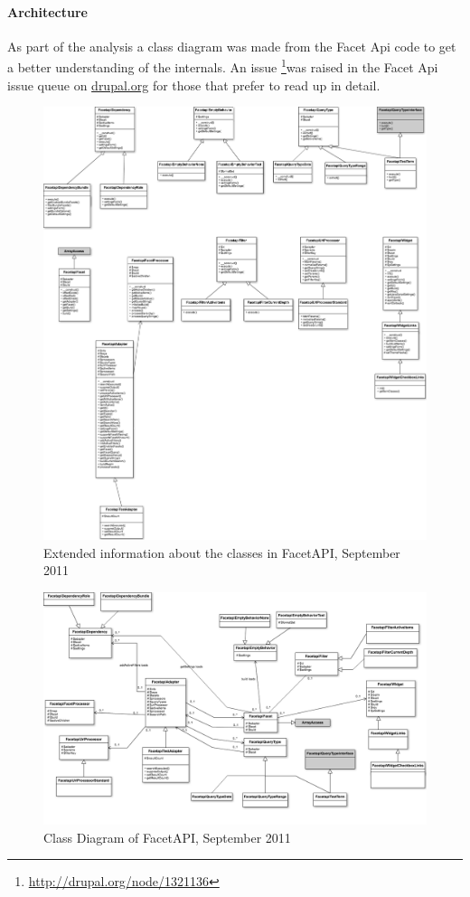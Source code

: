 \paragraph{Architecture}
As part of the analysis a class diagram was made from the Facet Api code to get a better understanding of the internals. An issue \footnote{\url{http://drupal.org/node/1321136}}was raised in the Facet Api issue queue on \url{drupal.org} for those that prefer to read up in detail.

\begin{figure}[H]
     \includegraphics[width=\textwidth]{images/facetapi_classdiagram.png}
     \caption{Extended information about the classes in FacetAPI, September 2011}
\end{figure}

\begin{figure}[H]
     \includegraphics[width=\textwidth]{images/ClassDiagram_facetapi.png}
     \caption{Class Diagram of FacetAPI, September 2011}
\end{figure}

